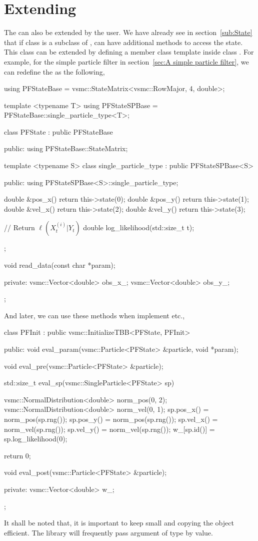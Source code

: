 \section{Extending \protect\spt}
\label{sec:Extending SP}

The  can also be extended by the user. We have
already see in section~\ref{sub:State} that if class  is a
subclass of ,  can have
additional methods to access the state. This class can be extended by defining
a member class template inside class . For example, for the simple
particle filter in section~\ref{sec:A simple particle filter}, we can redefine
the  as the following,
\begin{cppcode}
  using PFStateBase = vsmc::StateMatrix<vsmc::RowMajor, 4, double>;
  
  template <typename T>
  using PFStateSPBase = PFStateBase::single_particle_type<T>;
  
  class PFState : public PFStateBase
  {
      public:
      using PFStateBase::StateMatrix;
  
      template <typename S>
      class single_particle_type : public PFStateSPBase<S>
      {
          public:
          using PFStateSPBase<S>::single_particle_type;
  
          double &pos_x() { return this->state(0); }
          double &pos_y() { return this->state(1); }
          double &vel_x() { return this->state(2); }
          double &vel_y() { return this->state(3); }
  
          // Return $\ell(X_t^{(i)}|Y_t)$
          double log_likelihood(std::size_t t);
      };
  
      void read_data(const char *param);
  
      private:
      vsmc::Vector<double> obs_x_;
      vsmc::Vector<double> obs_y_;
  };
\end{cppcode}
And later, we can use these methods when implement  etc.,
\begin{cppcode}
  class PFInit : public vsmc::InitializeTBB<PFState, PFInit>
  {
      public:
      void eval_param(vsmc::Particle<PFState> &particle, void *param);

      void eval_pre(vsmc::Particle<PFState> &particle);
  
      std::size_t eval_sp(vsmc::SingleParticle<PFState> sp)
      {
          vsmc::NormalDistribution<double> norm_pos(0, 2);
          vsmc::NormalDistribution<double> norm_vel(0, 1);
          sp.pos_x() = norm_pos(sp.rng());
          sp.pos_y() = norm_pos(sp.rng());
          sp.vel_x() = norm_vel(sp.rng());
          sp.vel_y() = norm_vel(sp.rng());
          w_[sp.id()] = sp.log_likelihood(0);
  
          return 0;
      }
  
      void eval_post(vsmc::Particle<PFState> &particle);
  
      private:
      vsmc::Vector<double> w_;
  };
\end{cppcode}
It shall be noted that, it is important to keep
 small and copying the object efficient. The
library will frequently pass argument of  type by
value.
